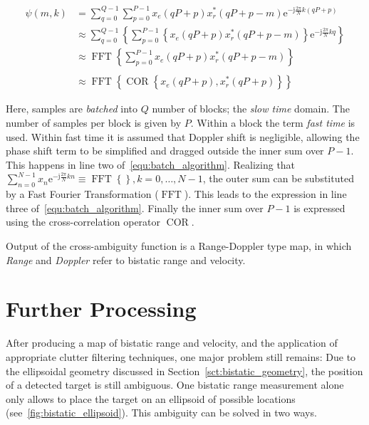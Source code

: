 \begin{equation}\label{equ:batch_algorithm}
    \begin{split}
        \psi(m,k) & = \sum_{q = 0}^{Q - 1}{\sum_{p = 0}^{P - 1}{x_{e}(q P + p) x_{r}^{*}(q P + p - m) \mathrm{e}^{-\mathrm{j} \frac{2 \pi}{N} k (q P + p)}}} \\
        & \approx \sum_{q = 0}^{Q - 1}{ \left\{ \sum_{p = 0}^{P - 1}{ \left\{ x_{e}(q P + p) x_{r}^{*}(q P + p - m) \right\} } \mathrm{e}^{-\mathrm{j} \frac{2 \pi}{N} k q} \right\} } \\
        & \approx \operatorname{FFT} \left\{ \sum_{p = 0}^{P - 1}{ x_{e}(q P + p) x_{r}^{*}(q P + p - m) } \right\} \\
        \\
        & \approx \operatorname{FFT} { \left\{ \operatorname{COR} { \left\{ x_{e}(q P + p), x_{r}^{*}(q P + p) \right\} } \right\} }
    \end{split}
\end{equation}

Here, samples are \emph{batched} into \(Q\) number of blocks; the \emph{slow time} domain. The number of samples per block is given by \(P\). Within a block the term \emph{fast time} is used. Within fast time it is assumed that Doppler shift is negligible, allowing the phase shift term to be simplified and dragged outside the inner sum over \(P - 1\). This happens in line two of~\ref{equ:batch_algorithm}. Realizing that \(\sum_{n = 0}^{N - 1}{ x_{n} \mathrm{e}^{-\mathrm{j} \frac{2 \pi}{N} k n} } \equiv \operatorname{FFT}{ \left\{ \right\} }, k = 0, \dots, N - 1 \), the outer sum can be substituted by a Fast Fourier Transformation (\(\operatorname{FFT}\)). This leads to the expression in line three of~\ref{equ:batch_algorithm}. Finally the inner sum over \(P - 1\) is expressed using the cross-correlation operator \(\operatorname{COR}\).

Output of the cross-ambiguity function is a Range-Doppler type map, in which \emph{Range} and \emph{Doppler} refer to bistatic range and velocity.

\section{Further Processing}

After producing a map of bistatic range and velocity, and the application of appropriate clutter filtering techniques, one major problem still remains: Due to the ellipsoidal geometry discussed in Section~\ref{sct:bistatic_geometry}, the position of a detected target is still ambiguous. One bistatic range measurement alone only allows to place the target on an ellipsoid of possible locations (see~\ref{fig:bistatic_ellipsoid}). This ambiguity can be solved in two ways.

